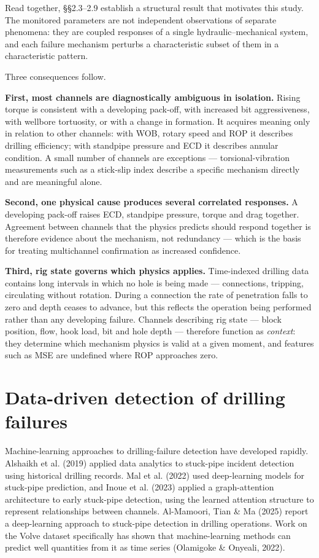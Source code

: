 \documentclass[12pt,a4paper]{report}
\begin{document}
Read together, §§2.3--2.9 establish a structural result that motivates this study. The monitored parameters
are not independent observations of separate phenomena: they are coupled responses of a single
hydraulic--mechanical system, and each failure mechanism perturbs a characteristic subset of them in a
characteristic pattern.

Three consequences follow.

\textbf{First, most channels are diagnostically ambiguous in isolation.} Rising torque is consistent with a
developing pack-off, with increased bit aggressiveness, with wellbore tortuosity, or with a change in
formation. It acquires meaning only in relation to other channels: with WOB, rotary speed and ROP it
describes drilling efficiency; with standpipe pressure and ECD it describes annular condition. A small
number of channels are exceptions --- torsional-vibration measurements such as a stick-slip index describe
a specific mechanism directly and are meaningful alone.

\textbf{Second, one physical cause produces several correlated responses.} A developing pack-off raises ECD,
standpipe pressure, torque and drag together. Agreement between channels that the physics predicts should
respond together is therefore evidence about the mechanism, not redundancy --- which is the basis for
treating multichannel confirmation as increased confidence.

\textbf{Third, rig state governs which physics applies.} Time-indexed drilling data contains long intervals in
which no hole is being made --- connections, tripping, circulating without rotation. During a connection the
rate of penetration falls to zero and depth ceases to advance, but this reflects the operation being
performed rather than any developing failure. Channels describing rig state --- block position, flow, hook
load, bit and hole depth --- therefore function as \emph{context}: they determine which mechanism physics is
valid at a given moment, and features such as MSE are undefined where ROP approaches zero.

\section{Data-driven detection of drilling failures}

Machine-learning approaches to drilling-failure detection have developed rapidly. Alshaikh et al. (2019)
applied data analytics to stuck-pipe incident detection using historical drilling records. Mal et al.
(2022) used deep-learning models for stuck-pipe prediction, and Inoue et al. (2023) applied a
graph-attention architecture to early stuck-pipe detection, using the learned attention structure to
represent relationships between channels. Al-Mamoori, Tian \& Ma (2025) report a deep-learning approach to
stuck-pipe detection in drilling operations. Work on the Volve dataset specifically has shown that
machine-learning methods can predict well quantities from it as time series (Olamigoke \& Onyeali, 2022).
\end{document}
